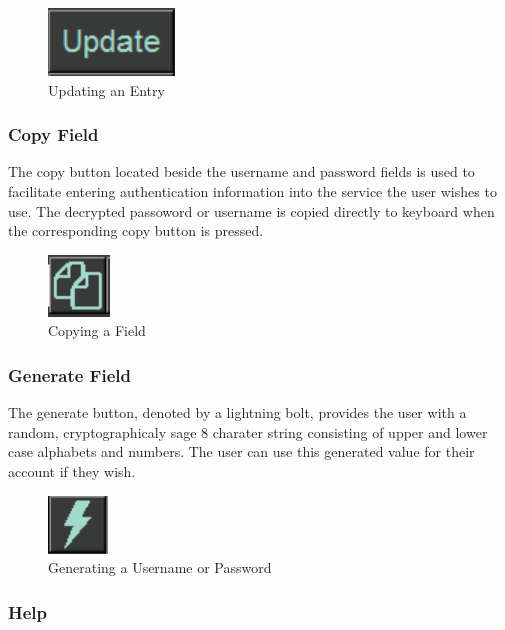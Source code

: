 \documentclass[12pt, titlepage]{article}
\begin{document}
\begin{figure}[h]
	\centering
	\includegraphics[scale=1.0]{images/Update.PNG}
	\caption{Updating an Entry}
	\label{fig:UpEnt}
\end{figure}

\subsubsection{Copy Field} \label{CopyField}

The copy button located beside the username and password fields is used to facilitate entering authentication information into the service the user wishes to use. The decrypted passoword or username is copied directly to keyboard when the corresponding copy button is pressed.

\begin{figure}[h]
	\centering
	\includegraphics[scale=1.0]{images/Copy.PNG}
	\caption{Copying a Field}
	\label{fig:CopF}
\end{figure}

\subsubsection{Generate Field} \label{GenField}

The generate button, denoted by a lightning bolt, provides the user with a random, cryptographicaly sage 8 charater string consisting of upper and lower case alphabets and numbers. The user can use this generated value for their account if they wish.

\begin{figure}[h]
	\centering
	\includegraphics[scale=1.0]{images/Generate.PNG}
	\caption{Generating a Username or Password}
	\label{fig:genPass}
\end{figure}

\subsubsection{Help} \label{UseMan}
\end{document}
